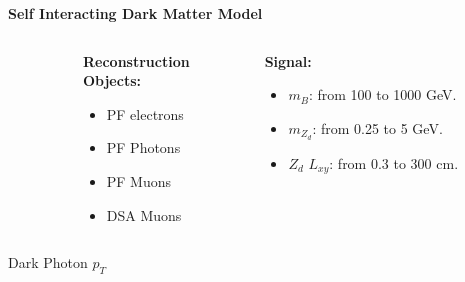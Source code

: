 \documentclass{beamer}
\begin{document}
\begin{frame}[t]{\textbf{Self Interacting Dark Matter Model}}
\begin{columns}
\begin{column}{.4\textwidth}
    \end{column}
    
    \begin{column}{.3\textwidth}
    \centering
    \textbf{\textcolor{peacockblue}{Reconstruction \\
    Objects:}}
    \begin{itemize}
        \item PF electrons
         \item PF Photons
         \item PF Muons
         \item DSA Muons
    \end{itemize}
        
    \end{column}
    \begin{column}{.3\textwidth}
    \centering
    \textbf{\textcolor{peacockblue}{Signal:}}
    \begin{itemize}
        \item   $m_B$: from 100 to 1000 GeV.
         \item $m_{Z_d}$: from 0.25 to 5 GeV.
         \item $Z_d$ $L_{xy}$: from 0.3 to 300 cm.
    \end{itemize}
    \end{column}
    \end{columns}
    \end{frame}
    \begin{frame}{Dark Photon $p_T$}
        
    \end{frame}
\end{document}
